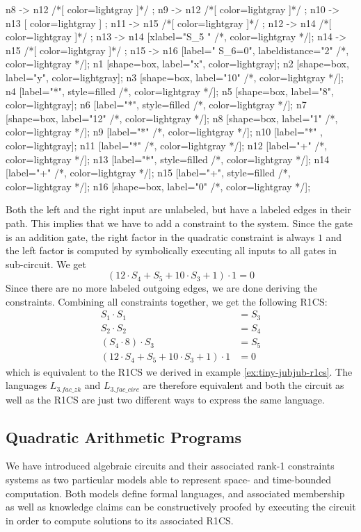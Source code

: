 \begin{example}
\begin{center}
{	n8 -> n12 /*[ color=lightgray ]*/ ;
	n9 -> n12 /*[ color=lightgray ]*/ ;
	n10 -> n13 [ color=lightgray ] ; 
	n11 -> n15 /*[ color=lightgray ]*/ ;
	n12 -> n14 /*[ color=lightgray ]*/ ;	
	n13 -> n14 [xlabel="S_5  "  /*, color=lightgray */];
	n14 -> n15 /*[ color=lightgray ]*/ ;
	n15 -> n16 [label="  S_6=0", labeldistance="2" /*, color=lightgray */];
	n1 [shape=box, label="x", color=lightgray];
	n2 [shape=box, label="y", color=lightgray];
	n3 [shape=box, label="10" /*, color=lightgray */];
	n4 [label="*", style=filled /*, color=lightgray */];
	n5 [shape=box, label="8", color=lightgray];
	n6 [label="*", style=filled /*, color=lightgray */];
	n7 [shape=box, label="12" /*, color=lightgray */];
	n8 [shape=box, label="1" /*, color=lightgray */];
	n9 [label="*" /*, color=lightgray */];
	n10 [label="*" , color=lightgray];
	n11 [label="*" /*, color=lightgray */];	
	n12 [label="+" /*, color=lightgray */];	
	n13 [label="*", style=filled /*, color=lightgray */];
	n14 [label="+" /*, color=lightgray */];
	n15 [label="+", style=filled /*, color=lightgray */];
	n16 [shape=box, label="0" /*, color=lightgray */];		
}
\end{center}
Both the left and the right input are  unlabeled, but have a labeled edges in their path. This implies that we have to add a constraint to the system. Since the gate is an addition gate, the right factor in the quadratic constraint is always $1$ and the left factor is computed by symbolically executing all inputs to all gates in sub-circuit. We get
$$
(12\cdot S_4 + S_5 + 10\cdot S_3 + 1)\cdot 1 = 0
$$
Since there are no more labeled outgoing edges, we are done deriving the constraints. Combining all constraints together, we get the following R1CS:
\begin{align*}
 S_1 \cdot S_1 &= S_3\\
 S_2 \cdot S_2 &= S_4\\
 (S_4\cdot 8)\cdot S_3 &= S_5\\
 (12\cdot S_4 + S_5 + 10\cdot S_3 + 1)\cdot 1 &= 0
\end{align*}
which is equivalent to the R1CS we derived in example \ref{ex:tiny-jubjub-r1cs}. The languages $L_{3.fac\_zk}$ and $L_{3.fac\_circ}$ are therefore equivalent and both the circuit as well as the R1CS are just two different ways to express the same language.
\end{example}
\subsection{Quadratic Arithmetic Programs}
\label{sec:QAP}
 We have introduced algebraic circuits and their associated rank-1 constraints systems as two particular models able to represent space- and time-bounded computation. Both models define formal languages, and associated membership as well as knowledge claims can be constructively proofed by executing the circuit in order to compute solutions to its associated R1CS. 

